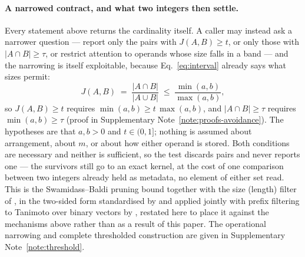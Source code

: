 \paragraph*{A narrowed contract, and what two integers then settle.}
Every statement above returns the cardinality itself. A caller may instead ask a narrower question ---
report only the pairs with $J(A,B)\ge t$, or only those with $|A\cap B|\ge\tau$, or restrict attention
to operands whose size falls in a band --- and the narrowing is itself exploitable, because
Eq.~\eqref{eq:interval} already says what sizes permit:
\begin{equation}
J(A,B) \;=\; \frac{|A\cap B|}{|A\cup B|} \;\le\; \frac{\min(a,b)}{\max(a,b)},
\label{eq:sizebound}
\end{equation}
so $J(A,B)\ge t$ requires $\min(a,b)\ge t\,\max(a,b)$, and $|A\cap B|\ge\tau$ requires
$\min(a,b)\ge\tau$ (proof in Supplementary Note~\ref{note:proofs-avoidance}). The hypotheses are that $a,b>0$ and $t\in(0,1]$;
nothing is assumed about arrangement, about $m$, or about how either operand is stored. Both conditions
are necessary and neither is sufficient, so the test discards pairs and never reports one --- the
survivors still go to an exact kernel, at the cost of one comparison between two integers already held
as metadata, no element of either set read. This is the Swamidass--Baldi pruning bound
\cite{swamidass2007bounds} together with the size (length) filter of
\cite{arasu2006exact}, in the two-sided form standardised by \cite{mann2016empirical} and applied
jointly with prefix filtering to Tanimoto over binary vectors by \cite{anastasiu2016tapnn}, restated here to place it against the mechanisms above
rather than as a result of this paper.
The operational narrowing and complete thresholded construction are given in Supplementary
Note~\ref{note:threshold}.

